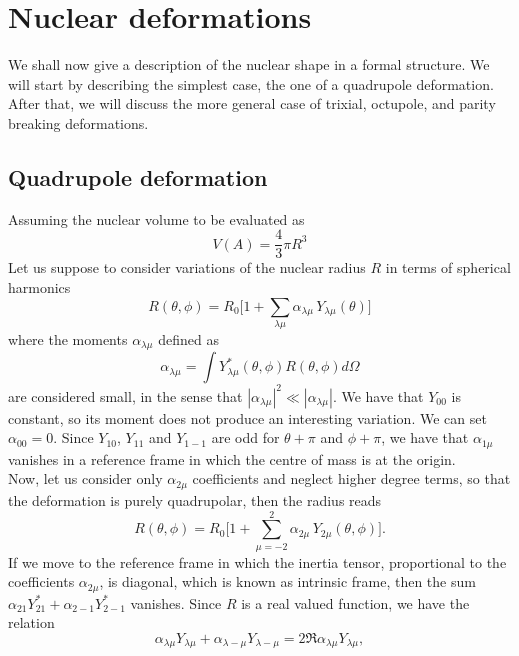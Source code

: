 \section{Nuclear deformations}
\label{sec:deformations}
We shall now give a description of the nuclear shape in a formal structure. We will start by describing the simplest case, the one of a quadrupole deformation. After that, we will discuss the more general case of trixial, octupole, and parity breaking deformations.
\subsection{Quadrupole deformation}
Assuming the nuclear volume to be evaluated as
\begin{equation}
    V(A) = \frac{4}{3}\pi R^3
\end{equation}
Let us suppose to consider variations of the nuclear radius $R$ in terms of spherical harmonics
\begin{equation}
    R(\theta, \phi) = R_0\bigg[1+\sum_{\lambda \mu}\alpha_{\lambda \mu}\,Y_{\lambda\mu}(\theta)\bigg]
\end{equation}
where the moments $\alpha_{\lambda \mu}$ defined as
\begin{equation}
    \alpha_{\lambda \mu}=\int Y_{\lambda\mu}^*(\theta, \phi)R(\theta, \phi) d\Omega
\end{equation}
are considered small, in the sense that $|\alpha_{\lambda \mu}| ^2 \ll |\alpha_{\lambda \mu}| $. We have that $Y_{00}$ is constant, so its moment does not produce an interesting variation. We can set $\alpha_{00}=0$. 
Since $Y_{10}$, $Y_{11}$ and $Y_{1-1}$ are odd for $\theta + \pi$ and $\phi + \pi$, we have that $\alpha_{1\mu}$ vanishes in a reference frame in which the centre of mass is at the origin.
\\Now, let us consider only $\alpha_{2\mu}$ coefficients and neglect higher degree terms, so that the deformation is purely quadrupolar, then the radius reads
\begin{equation}
    R(\theta, \phi) = R_0\bigg[1+\sum_{\mu=-2}^2\alpha_{2\mu}\,Y_{2\mu}(\theta, \phi)\bigg].
\end{equation}
If we move to the reference frame in which the inertia tensor, proportional to the coefficients $\alpha_{2\mu}$, is diagonal, which is known as intrinsic frame, then the sum $\alpha_{21}Y^*_{21} + \alpha_{2-1}Y^*_{2-1}$ vanishes. Since $R$ is a real valued function, we have the relation
\begin{equation}
\alpha_{\lambda \mu}Y_{\lambda\mu}+\alpha_{\lambda -\mu}Y_{\lambda-\mu}=2\Re{\alpha_{\lambda \mu}Y_{\lambda\mu}},
\end{equation}
